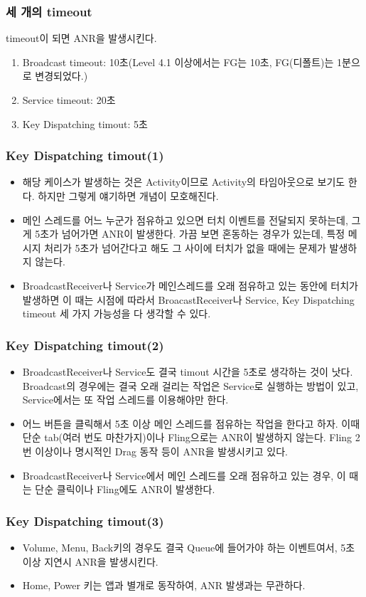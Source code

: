 \documentclass{beamer}
\begin{document}
\begin{frame}
\frametitle{세 개의 timeout}
timeout이 되면 ANR을 발생시킨다.
\begin{enumerate}
\item Broadcast timeout: 10초(Level 4.1 이상에서는 FG는 10초, FG(디폴트)는 1분으로 변경되었다.)
\item Service timeout: 20초
\item Key Dispatching timout: 5초
\end{enumerate}
\end{frame}

\begin{frame}
\frametitle{Key Dispatching timout(1)}
\begin{itemize}
\item 해당 케이스가 발생하는 것은 Activity이므로 Activity의 타임아웃으로 보기도 한다. 하지만 그렇게 얘기하면 개념이 모호해진다.
\item 메인 스레드를 어느 누군가 점유하고 있으면 터치 이벤트를 전달되지 못하는데, 그게 5초가 넘어가면 ANR이 발생한다. 
가끔 보면 혼동하는 경우가 있는데, 특정 메시지 처리가 5초가 넘어간다고 해도 그 사이에 터치가 없을 때에는 문제가 발생하지 않는다.
\item BroadcastReceiver나 Service가 메인스레드를 오래 점유하고 있는 동안에 터치가 발생하면 이 때는 시점에 따라서 BroacastReceiver나 Service, Key Dispatching timeout 세 가지 가능성을 다 생각할 수 있다.
\end{itemize}
\end{frame}

\begin{frame}
\frametitle{Key Dispatching timout(2)}
\begin{itemize}
\item BroadcastReceiver나 Service도 결국 timout 시간을 5초로 생각하는 것이 낫다. Broadcast의 경우에는 결국 오래 걸리는 작업은 Service로 실행하는 방법이 있고, Service에서는 또 작업 스레드를 이용해야만 한다.
\item 어느 버튼을 클릭해서 5초 이상 메인 스레드를 점유하는 작업을 한다고 하자. 이때 단순 tab(여러 번도 마찬가지)이나 Fling으로는 ANR이 발생하지 않는다. Fling 2번 이상이나 명시적인 Drag 동작 등이 ANR을 발생시키고 있다.
\item BroadcastReceiver나 Service에서 메인 스레드를 오래 점유하고 있는 경우, 이 때는 단순 클릭이나 Fling에도 ANR이 발생한다.
\end{itemize}
\end{frame}

\begin{frame}
\frametitle{Key Dispatching timout(3)}
\begin{itemize}
\item Volume, Menu, Back키의 경우도 결국 Queue에 들어가야 하는 이벤트여서, 5초 이상 지연시 ANR을 발생시킨다.
\item Home, Power 키는 앱과 별개로 동작하여, ANR 발생과는 무관하다.
\end{itemize}
\end{frame}
\end{document}
